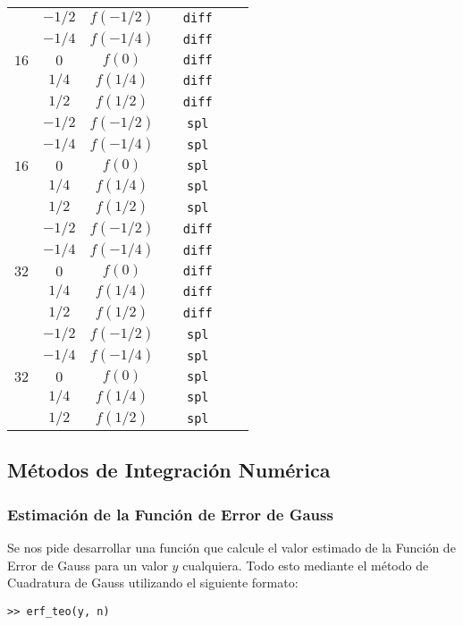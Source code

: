 \documentclass[12pt,letterpaper]{article}
\begin{document}
\begin{center}
\begin{tabular}{|c|c|c|c|c|c|c|}
		\multirow{5}{*}{$16$}
			& $-1/2$ & $f(-1/2)$ & & \verb+diff+ & & \\
			& $-1/4$ & $f(-1/4)$ & & \verb+diff+ & & \\
			& $0$ & $f(0)$ & & \verb+diff+ & & \\
			& $1/4$ & $f(1/4)$ & & \verb+diff+ & & \\
			& $1/2$ & $f(1/2)$ & & \verb+diff+ & & \\
		\hline
		\multirow{5}{*}{$16$}
			& $-1/2$ & $f(-1/2)$ & & \verb+spl+ & & \\
			& $-1/4$ & $f(-1/4)$ & & \verb+spl+ & & \\
			& $0$ & $f(0)$ & & \verb+spl+ & & \\
			& $1/4$ & $f(1/4)$ & & \verb+spl+ & & \\
			& $1/2$ & $f(1/2)$ & & \verb+spl+ & & \\
		\hline \hline
		
		\multirow{5}{*}{$32$}
			& $-1/2$ & $f(-1/2)$ & & \verb+diff+ & & \\
			& $-1/4$ & $f(-1/4)$ & & \verb+diff+ & & \\
			& $0$ & $f(0)$ & & \verb+diff+ & & \\
			& $1/4$ & $f(1/4)$ & & \verb+diff+ & & \\
			& $1/2$ & $f(1/2)$ & & \verb+diff+ & & \\
		\hline
		\multirow{5}{*}{$32$}
			& $-1/2$ & $f(-1/2)$ & & \verb+spl+ & & \\
			& $-1/4$ & $f(-1/4)$ & & \verb+spl+ & & \\
			& $0$ & $f(0)$ & & \verb+spl+ & & \\
			& $1/4$ & $f(1/4)$ & & \verb+spl+ & & \\
			& $1/2$ & $f(1/2)$ & & \verb+spl+ & & \\
		\hline
	\end{tabular}
\end{center}

\subsection{Métodos de Integración Numérica}
\subsubsection{Estimación de la Función de Error de Gauss}
Se nos pide desarrollar una función que calcule el valor estimado de la Función de Error de Gauss para un valor $y$ cualquiera. Todo esto mediante el método de Cuadratura de Gauss utilizando el siguiente formato:
\begin{center}
\verb+>> erf_teo(y, n)+
\end{center}
\end{document}

